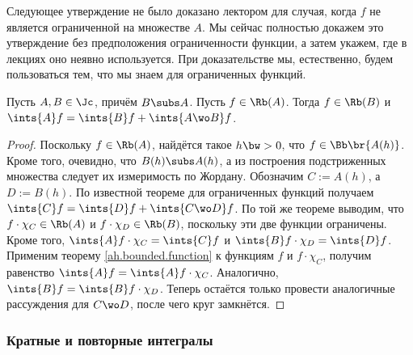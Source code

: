 \documentclass[a4paper]{article}
\begin{document}
Следующее утверждение не было доказано лектором для случая, когда $f$ не является ограниченной на
множестве $A$. Мы сейчас полностью докажем это утверждение без предположения ограниченности
функции, а затем укажем, где в лекциях оно неявно используется. При доказательстве мы, естественно,
будем пользоваться тем, что мы знаем для ограниченных функций.

\begin{theorem}
\label{integration.on.subset}
Пусть $A, B \in \Jc$, причём $B \subs A$. Пусть $f \in \Rb(A)$. Тогда $f \in \Rb(B)$ и
$\ints{A} f = \ints{B} f + \ints{A \wo B} f$.
\end{theorem}
\begin{proof}
Поскольку $f \in \Rb(A)$, найдётся такое $h\bw>0$, что $f \in \Bb\br{A(h)}$. Кроме того, очевидно,
что $B(h) \subs A(h)$, а из построения подстриженных множества следует их измеримость по Жордану.
Обозначим $C := A(h)$, а $D := B(h)$. По известной теореме для ограниченных функций получаем
$\ints{C} f = \ints{D} f + \ints{C\wo D}f$. По той же теореме выводим, что
$f \cdot \chi_C \in \Rb(A)$ и $f \cdot \chi_D \in \Rb(B)$, поскольку эти две функции
ограничены. Кроме того, $\ints{A} f \cdot \chi_C = \ints{C} f$ и $\ints{B} f \cdot \chi_D = \ints{D} f$.
Применим теорему \ref{ah.bounded.function} к функциям $f$ и $f \cdot \chi_C$, получим
равенство $\ints{A} f = \ints{A} f \cdot \chi_C$. Аналогично, $\ints{B} f = \ints{B} f \cdot \chi_D$.
Теперь остаётся только провести аналогичные рассуждения для $C\wo D$, после чего круг замкнётся.
\end{proof}


\subsubsection{Кратные и повторные интегралы}
\end{document}
